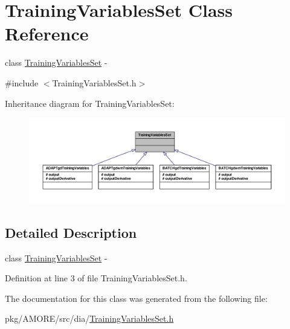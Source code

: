 \hypertarget{class_training_variables_set}{
\section{TrainingVariablesSet Class Reference}
\label{class_training_variables_set}
}


class \hyperlink{class_training_variables_set}{TrainingVariablesSet} -\/  




{\ttfamily \#include $<$TrainingVariablesSet.h$>$}



Inheritance diagram for TrainingVariablesSet:\nopagebreak
\begin{figure}[H]
\begin{center}
\leavevmode
\includegraphics[width=400pt]{class_training_variables_set__inherit__graph}
\end{center}
\end{figure}


\subsection{Detailed Description}
class \hyperlink{class_training_variables_set}{TrainingVariablesSet} -\/ 

Definition at line 3 of file TrainingVariablesSet.h.



The documentation for this class was generated from the following file:\begin{DoxyCompactItemize}
\item 
pkg/AMORE/src/dia/\hyperlink{_training_variables_set_8h}{TrainingVariablesSet.h}\end{DoxyCompactItemize}
